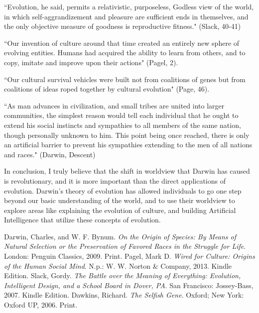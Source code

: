 \documentclass[11pt, oneside]{article}
\begin{document}
``Evolution, he said, permits a relativistic, purposeless, Godless view of the world, in which self-aggrandizement and pleasure are sufficient ends in themselves, and the only objective measure of goodness is reproductive fitness." (Slack, 40-41)

``Our invention of culture around that time created an entirely new sphere of evolving entities. Humans had acquired the ability to learn from others, and to copy, imitate and improve upon their actions" (Pagel, 2).

``Our cultural survival vehicles were built not from coalitions of genes but from coalitions of ideas roped together by cultural evolution" (Page, 46).

``As man advances in civilization, and small tribes are united into larger communities, the simplest reason would tell each individual that he ought to extend his social instincts and sympathies to all members of the same nation, though personally unknown to him. This point being once reached, there is only an artificial barrier to prevent his sympathies extending to the men of all nations and races." (Darwin, Descent)


\par In conclusion, I truly believe that the shift in worldview that Darwin has caused is revolutionary, and it is more important than the direct applications of evolution. Darwin's theory of evolution has allowed individuals to go one step beyond our basic understanding of the world, and to use their worldview to explore areas like explaining the evolution of culture, and building Artificial Intelligence that utilize these concepts of evolution. 


\begin{thebibliography}{9}
	Darwin, Charles, and W. F. Bynum.
	\emph{On the Origin of Species: By Means of Natural Selection or the Preservation of Favored Races in the Struggle for Life}.
	London: Penguin Classics, 2009.
	Print.
	Pagel, Mark D. 
	\emph{Wired for Culture: Origins of the Human Social Mind}. 
	N.p.: W. W. Norton \& Company, 2013. 
	Kindle Edition. 
	Slack, Gordy. 
	\emph{The Battle over the Meaning of Everything: Evolution, Intelligent Design, and a School Board in Dover, PA}.
	San Francisco: Jossey-Bass, 2007. 
	Kindle Edition.
	Dawkins, Richard. 
	\emph{The Selfish Gene}.
	Oxford; New York: Oxford UP, 2006. 
	Print.
\end{thebibliography}
\end{document}
